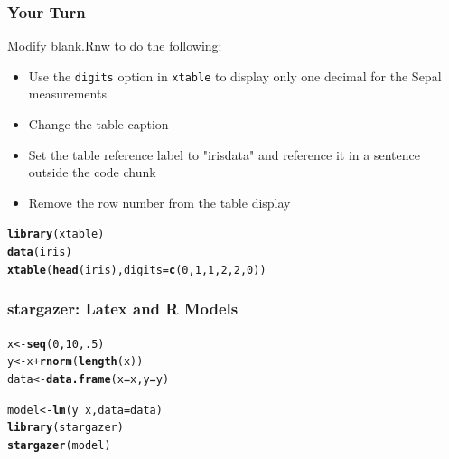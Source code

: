 \documentclass{beamer}\usepackage[]{graphicx}\usepackage[]{color}
\makeatletter
\newcommand{\hlnum}[1]{\textcolor[rgb]{0.686,0.059,0.569}{#1}}%
\newcommand{\hlopt}[1]{\textcolor[rgb]{0,0,0}{#1}}%
\newcommand{\hlstd}[1]{\textcolor[rgb]{0.345,0.345,0.345}{#1}}%
\newcommand{\hlkwb}[1]{\textcolor[rgb]{0.69,0.353,0.396}{#1}}%
\newcommand{\hlkwc}[1]{\textcolor[rgb]{0.333,0.667,0.333}{#1}}%
\newcommand{\hlkwd}[1]{\textcolor[rgb]{0.737,0.353,0.396}{\textbf{#1}}}%
\newenvironment{kframe}{%
 \def\at@end@of@kframe{}%
 \ifinner\ifhmode%
  \def\at@end@of@kframe{\end{minipage}}%
  \begin{minipage}{\columnwidth}%
 \fi\fi%
 \def\FrameCommand##1{\hskip\@totalleftmargin \hskip-\fboxsep
 \colorbox{shadecolor}{##1}\hskip-\fboxsep
     \hskip-\linewidth \hskip-\@totalleftmargin \hskip\columnwidth}%
 \MakeFramed {\advance\hsize-\width
   \@totalleftmargin\z@ \linewidth\hsize
   \@setminipage}}%
 {\par\unskip\endMakeFramed%
 \at@end@of@kframe}
\newenvironment{knitrout}{}{} %
\makeatother
\begin{document}
\begin{frame}[fragile]
\frametitle{Your Turn}
Modify \href{../code/02-blank.Rnw}{blank.Rnw} to do the following:
\begin{itemize}
\item Use the \texttt{digits} option in \texttt{xtable} to display only one decimal for the Sepal measurements
\item Change the table caption
\item Set the table reference label to "irisdata" and reference it in a sentence outside the code chunk
\item Remove the row number from the table display
\end{itemize}

\begin{knitrout}\footnotesize
{}\color{fgcolor}\begin{kframe}
\begin{alltt}
\hlkwd{library}\hlstd{(xtable)}
\hlkwd{data}\hlstd{(iris)}
\hlkwd{xtable}\hlstd{(}\hlkwd{head}\hlstd{(iris),} \hlkwc{digits}\hlstd{=}\hlkwd{c}\hlstd{(}\hlnum{0}\hlstd{,} \hlnum{1}\hlstd{,} \hlnum{1}\hlstd{,} \hlnum{2}\hlstd{,} \hlnum{2}\hlstd{,} \hlnum{0}\hlstd{))}
\end{alltt}
\end{kframe}
\end{knitrout}

\end{frame}


\begin{frame}[fragile]
\frametitle{stargazer: Latex and R Models}
\begin{knitrout}\footnotesize
{}\color{fgcolor}\begin{kframe}
\begin{alltt}
\hlstd{x} \hlkwb{<-} \hlkwd{seq}\hlstd{(}\hlnum{0}\hlstd{,} \hlnum{10}\hlstd{,} \hlnum{.5}\hlstd{)}
\hlstd{y} \hlkwb{<-} \hlstd{x}\hlopt{+}\hlkwd{rnorm}\hlstd{(}\hlkwd{length}\hlstd{(x))}
\hlstd{data} \hlkwb{<-} \hlkwd{data.frame}\hlstd{(}\hlkwc{x}\hlstd{=x,} \hlkwc{y}\hlstd{=y)}

\hlstd{model} \hlkwb{<-} \hlkwd{lm}\hlstd{(y}\hlopt{~}\hlstd{x,} \hlkwc{data}\hlstd{=data)}
\hlkwd{library}\hlstd{(stargazer)}
\hlkwd{stargazer}\hlstd{(model)}
\end{alltt}
\end{kframe}
\end{knitrout}

\end{frame}
\end{document}
